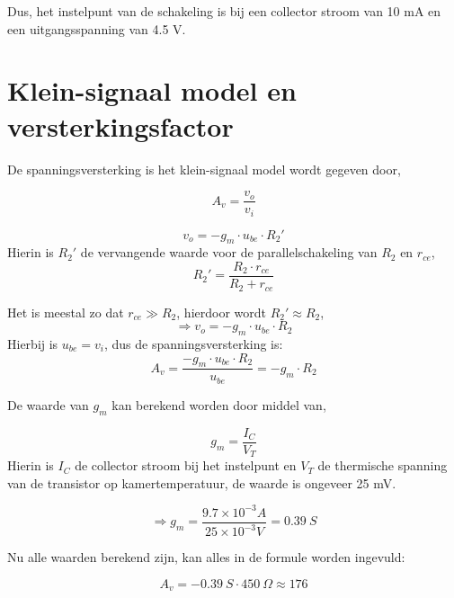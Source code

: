 \documentclass{report}
\begin{document}
\noindent Dus, het instelpunt van de schakeling is bij een collector stroom van 10 mA en een uitgangsspanning van 4.5 V.

\newpage
\section{Klein-signaal model en versterkingsfactor}

De spanningsversterking is het klein-signaal model wordt gegeven door,

\begin{equation}
A_v=\frac{v_o}{v_i}
\end{equation}

\begin{equation}
v_o=-g_m\cdot u_{be}\cdot R_2'
\end{equation}
Hierin is $R_2'$ de vervangende waarde voor de parallelschakeling van $R_2$ en $r_{ce}$,
$$R_2'=\frac{R_2\cdot r_{ce}}{R_2+r_{ce}}$$

\noindent Het is meestal zo dat $r_{ce}\gg R_2$, hierdoor wordt $R_2'\approx R_2$,
$$\Rightarrow v_o=-g_m\cdot u_{be}\cdot R_2$$
Hierbij is $u_{be}=v_i$, dus de spanningsversterking is:
$$A_v=\frac{-g_m\cdot u_{be}\cdot R_2}{u_{be}}=-g_m\cdot R_2$$

\noindent De waarde van $g_m$ kan berekend worden door middel van,

\begin{equation}
g_m=\frac{I_C}{V_T}
\end{equation}
Hierin is $I_C$ de collector stroom bij het instelpunt en $V_T$ de thermische spanning van de transistor op kamertemperatuur, de waarde is ongeveer 25 mV.

$$\Rightarrow g_m=\frac{9.7\times 10^{-3}A}{25\times 10^{-3}V}= 0.39 \: S$$

Nu alle waarden berekend zijn, kan alles in de formule worden ingevuld:

$$A_v= -0.39 \: S\cdot 450 \: \Omega\approx 176 $$
\end{document}
